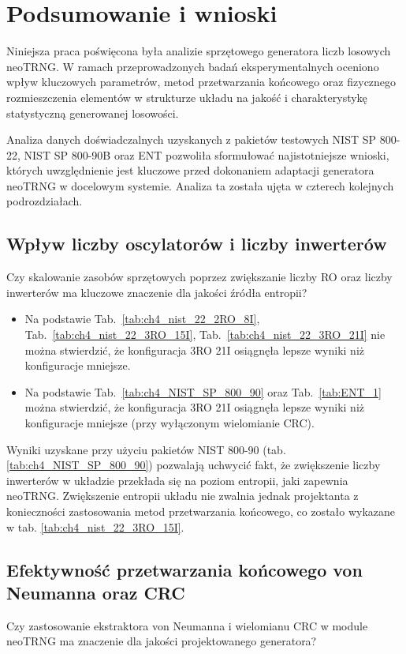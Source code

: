 \chapter{Podsumowanie i wnioski}

\noindent Niniejsza praca poświęcona była analizie sprzętowego generatora liczb 
losowych neoTRNG. W ramach przeprowadzonych badań eksperymentalnych oceniono 
wpływ kluczowych parametrów, metod przetwarzania końcowego oraz fizycznego 
rozmieszczenia elementów w strukturze układu na jakość i charakterystykę 
statystyczną generowanej losowości.

Analiza danych doświadczalnych uzyskanych z pakietów testowych NIST SP 800-22, 
NIST SP 800-90B oraz ENT pozwoliła sformułować najistotniejsze wnioski, których 
uwzględnienie jest kluczowe przed dokonaniem adaptacji generatora neoTRNG w 
docelowym systemie. Analiza ta została ujęta w czterech kolejnych podrozdziałach.

\section{Wpływ liczby oscylatorów i liczby inwerterów}

\noindent Czy skalowanie zasobów sprzętowych poprzez zwiększanie liczby RO oraz
liczby inwerterów ma kluczowe znaczenie dla jakości źródła entropii?

\begin{itemize}
\item Na podstawie Tab.~\ref{tab:ch4_nist_22_2RO_8I},
Tab.~\ref{tab:ch4_nist_22_3RO_15I}, Tab.~\ref{tab:ch4_nist_22_3RO_21I} nie można
stwierdzić, że konfiguracja 3RO 21I osiągnęła lepsze wyniki niż
konfiguracje mniejsze.
\item Na podstawie Tab.~\ref{tab:ch4_NIST_SP_800_90} oraz Tab.~\ref{tab:ENT_1}
można stwierdzić, że konfiguracja 3RO 21I osiągnęła lepsze wyniki niż konfiguracje
mniejsze (przy wyłączonym wielomianie CRC).
\end{itemize}

Wyniki uzyskane przy użyciu pakietów NIST 800-90 (tab. \ref{tab:ch4_NIST_SP_800_90}) 
pozwalają uchwycić fakt, że zwiększenie liczby inwerterów w układzie przekłada 
się na poziom entropii, jaki zapewnia neoTRNG. Zwiększenie entropii układu nie 
zwalnia jednak projektanta z konieczności zastosowania metod przetwarzania 
końcowego, co zostało wykazane w tab. \ref{tab:ch4_nist_22_3RO_15I}.


\section{Efektywność przetwarzania końcowego von Neumanna oraz CRC}
\noindent Czy zastosowanie ekstraktora von Neumanna i wielomianu CRC w module neoTRNG
ma znaczenie dla jakości projektowanego generatora?

